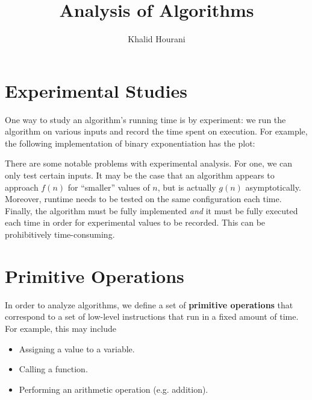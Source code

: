 \documentclass[a4paper]{article}
\title{Analysis of Algorithms}
\author{Khalid Hourani}
\begin{document}
\maketitle

\section{Experimental Studies}
One way to study an algorithm's running time is by experiment: we run the algorithm on various inputs and record the time spent on execution. For example, the following implementation of binary exponentiation has the plot: 


There are some notable problems with experimental analysis. For one, we can only test certain inputs. It may be the case that an algorithm appears to approach $f(n)$ for ``smaller'' values of $n$, but is actually $g(n)$ asymptotically. Moreover, runtime needs to be tested on the same configuration each time. Finally, the algorithm must be fully implemented \textit{and} it must be fully executed each time in order for experimental values to be recorded. This can be prohibitively time-consuming.

\section{Primitive Operations}

In order to analyze algorithms, we define a set of \textbf{primitive operations} that correspond to a set of low-level instructions that run in a fixed amount of time. For example, this may include 

\begin{itemize}
\item Assigning a value to a variable.
\item Calling a function.
\item Performing an arithmetic operation (e.g. addition).
\end{itemize}
\end{document}
